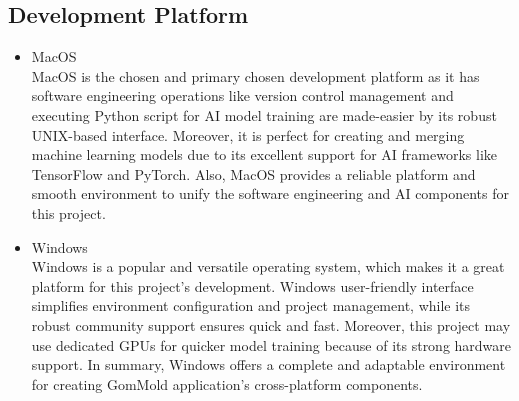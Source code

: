 \documentclass[conference]{IEEEtran}
\begin{document}
\subsection{Development Platform}
    \begin{itemize}
    \item MacOS \\
    MacOS is the chosen and primary chosen development platform as it has software engineering operations like version control management and executing Python script for AI model training are made-easier by its robust UNIX-based interface. Moreover, it is perfect for creating and merging machine learning models due to its excellent support for AI frameworks like TensorFlow and PyTorch. Also, MacOS provides a reliable platform and smooth environment to unify the software engineering and AI components for this project.
    \end{itemize}
    \begin{itemize}
    \item Windows \\
    Windows is a popular and versatile operating system, which makes it a great platform for this project’s development. Windows user-friendly interface simplifies environment configuration and project management, while its robust community support ensures quick and fast. Moreover, this project may use dedicated GPUs for quicker model training because of its strong hardware support. In summary, Windows offers a complete and adaptable environment for creating GomMold application's cross-platform components.
    \end{itemize}
\end{document}
